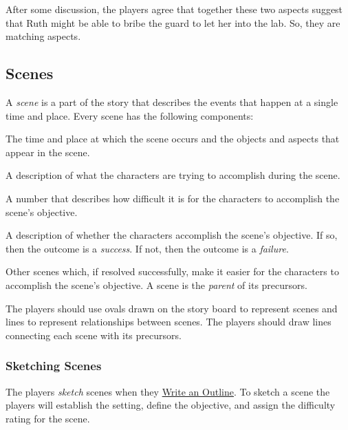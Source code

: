\documentclass[12pt, a5paper, parskip=half-, footheight=1.4cm]{scrartcl}
\begin{document}
After some discussion, the players agree that together these two aspects suggest that Ruth might be able to bribe the guard to let her into the lab.  So, they are matching aspects.

\newpage

\subsection*{Scenes} \label{subsection:scenes}
A \emph{scene} is a part of the story that describes the events that happen at a single time and place.
Every scene has the following components:
\begin{description}[labelindent=0.25cm, leftmargin=\widthof{\hspace{0.25cm}\textbullet\space}, font=\normalfont\textbullet\bfseries\space]
  \item[Setting:]
  The time and place at which the scene occurs and the objects and aspects that appear in the scene.
  \item[Objective:]
    A description of what the characters are trying to accomplish during the scene.
  \item[Difficulty Rating:]
    A number that describes how difficult it is for the characters to accomplish the scene's objective.
  \item[Outcome:]
    A description of whether the characters accomplish the scene's objective. If so, then the outcome is a \emph{success}.  If not, then the outcome is a \emph{failure}.
  \item[Precursors:]
    Other scenes which, if resolved successfully, make it easier for the characters to accomplish the scene's objective.
    A scene is the \emph{parent} of its precursors.
\end{description} 

\bigskip

The players should use ovals drawn on the story board to represent scenes and lines to represent relationships between scenes.
The players should draw lines connecting each scene with its precursors.

\newpage

\subsubsection*{Sketching Scenes} \label{subsubsection:sketching-scenes}
The players \emph{sketch} scenes when they \hyperref[subsection:write-an-outline]{\cinzel \small Write an Outline}. 
To sketch a scene the players will establish the setting, define the objective, and assign the difficulty rating for the scene.
\end{document}
